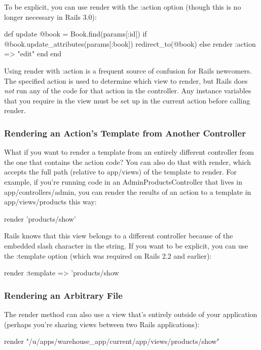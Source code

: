 \documentclass[10pt]{book}
\newenvironment{code}{%
  \scriptsize
    \verbatim
}{%
    \endverbatim
    \newline
}
\begin{document}
To be explicit, you can use render with the :action option (though this is no longer necessary in Rails 3.0):
\begin{code}
def update
  @book = Book.find(params[:id])
  if @book.update_attributes(params[:book])
    redirect_to(@book)
  else
    render :action => "edit"
  end
end
\end{code}

Using render with :action is a  frequent source of confusion for Rails newcomers. The specified action  is used to determine which view to render, but Rails does \emph{not}  run any of the code for that action in the controller. Any instance  variables that you require in the view must be set up in the current  action before calling render.

\subsubsection{ Rendering an Action’s Template from Another Controller}

What if you want to render a template from an entirely different  controller from the one that contains the action code? You can also do  that with render, which accepts the full path (relative to app/views) of the template to render. For example, if you’re running code in an AdminProductsController that lives in app/controllers/admin, you can render the results of an action to a template in app/views/products this way:
\begin{code}
render 'products/show'
\end{code}

Rails knows that this view belongs to a different controller because  of the embedded slash character in the string. If you want to be  explicit, you can use the :template option (which was required on Rails 2.2 and earlier):
\begin{code}
render :template => 'products/show
\end{code}

\subsubsection{ Rendering an Arbitrary File}

The render method can also use a view that’s entirely  outside of your application (perhaps you’re sharing views between two  Rails applications):
\begin{code}
render "/u/apps/warehouse_app/current/app/views/products/show"
\end{code}
\end{document}
